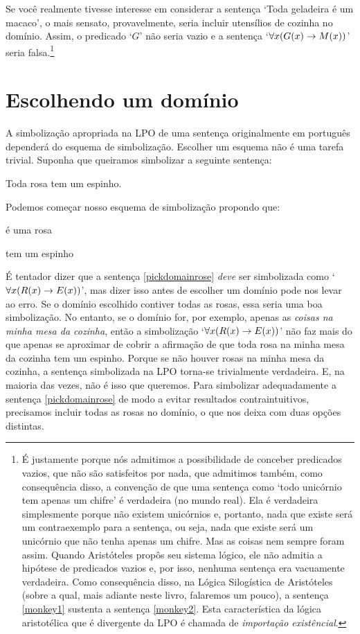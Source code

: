Se você realmente tivesse interesse em considerar a sentença `Toda geladeira é um macaco', o mais sensato, provavelmente, seria incluir utensílios de cozinha no domínio.
Assim, o predicado `$G$' não seria vazio e a sentença `$\forall x(\mathord{G}(x) \rightarrow \mathord{M}(x))$' seria falsa.\footnote{
			É justamente porque nós admitimos a possibilidade de conceber predicados vazios, que não são satisfeitos por nada, que admitimos também, como consequência disso,  a convenção de que uma sentença como `todo unicórnio tem apenas um chifre' é verdadeira (no mundo real).
			Ela é verdadeira simplesmente porque não existem unicórnios e, portanto, nada que existe será um contraexemplo para a sentença, ou seja, nada que existe será um unicórnio que não tenha apenas um chifre.
			Mas as coisas nem sempre foram assim.
			Quando Aristóteles propôs seu sistema lógico, ele não admitia a hipótese de predicados vazios e, por isso, nenhuma sentença era vacuamente verdadeira.
			Como consequência disso, na Lógica Silogística de Aristóteles (sobre a qual, mais adiante neste livro, falaremos um pouco), a sentença \ref{monkey1} sustenta a sentença \ref{monkey2}.
			Esta característica da lógica aristotélica que é divergente da LPO é chamada de \emph{importação existêncial}.}


\section{Escolhendo um domínio}
A simbolização apropriada na LPO de uma sentença originalmente em português dependerá do esquema de simbolização.
Escolher um esquema não é uma tarefa trivial.
Suponha que queiramos simbolizar a seguinte sentença:
	\begin{earg}
		\item[\ex{pickdomainrose}] Toda rosa tem um espinho.
	\end{earg}
Podemos começar nosso esquema de simbolização propondo que:
	\begin{ekey}
		\item[\atom{R}{x}]  é uma rosa
		\item[\atom{E}{x}]  tem um espinho
	\end{ekey}
É tentador dizer que a sentença \ref{pickdomainrose} \emph{deve} ser simbolizada como `$\forall x(\mathord{R}(x) \rightarrow \mathord{E}(x))$', mas dizer isso antes de escolher um domínio pode nos levar ao erro.
Se o domínio escolhido contiver todas as rosas, essa seria uma boa simbolização. No entanto, se o domínio for, por exemplo, apenas as \emph{coisas na minha mesa da cozinha}, então a simbolização `$\forall x(\mathord{R}(x) \rightarrow \mathord{E}(x))$' não faz mais do que apenas se aproximar de cobrir a afirmação de que toda rosa na minha mesa da cozinha tem um espinho.
Porque se não houver rosas na minha mesa da cozinha, a sentença simbolizada na LPO torna-se trivialmente verdadeira.
E, na maioria das vezes, não é isso que queremos.
Para simbolizar adequadamente a sentença \ref{pickdomainrose} de modo a evitar resultados contraintuitivos, precisamos incluir todas as rosas no domínio, o que nos deixa com duas opções distintas. 

